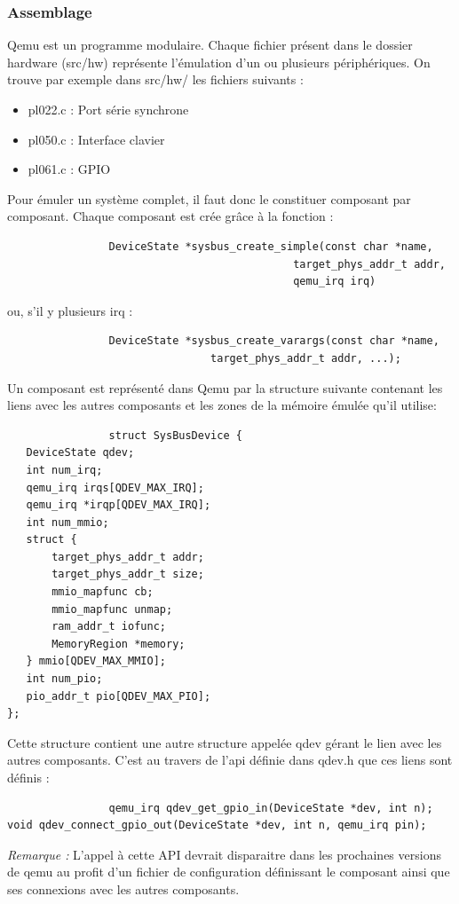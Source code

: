 \documentclass{article}
\begin{document}
		\subsubsection{Assemblage}
			Qemu est un programme modulaire. Chaque fichier présent dans le dossier hardware (src/hw) représente l'émulation d'un ou plusieurs 
			périphériques. On trouve par exemple dans src/hw/ les fichiers suivants : 
			\begin{itemize}
				\item pl022.c : Port série synchrone
				\item pl050.c : Interface clavier
				\item pl061.c : GPIO 
			\end{itemize}
			Pour émuler un système complet, il faut donc le constituer composant par composant. Chaque composant est crée grâce à la fonction : 
			\begin{verbatim}
				DeviceState *sysbus_create_simple(const char *name,
                                             target_phys_addr_t addr,
                                             qemu_irq irq)
			\end{verbatim}
			ou, s'il y plusieurs irq : 
			\begin{verbatim}
				DeviceState *sysbus_create_varargs(const char *name,
                                target_phys_addr_t addr, ...);
			\end{verbatim}
			Un composant est représenté dans Qemu par la structure suivante contenant les liens avec les autres composants et les zones de 
			la mémoire émulée qu'il utilise: 
			\begin{verbatim}
				struct SysBusDevice {
   DeviceState qdev;
   int num_irq;
   qemu_irq irqs[QDEV_MAX_IRQ];
   qemu_irq *irqp[QDEV_MAX_IRQ];
   int num_mmio;
   struct {
       target_phys_addr_t addr;
       target_phys_addr_t size;
       mmio_mapfunc cb;
       mmio_mapfunc unmap;
       ram_addr_t iofunc;
       MemoryRegion *memory;
   } mmio[QDEV_MAX_MMIO];
   int num_pio;
   pio_addr_t pio[QDEV_MAX_PIO];
};
			\end{verbatim}
			Cette structure contient une autre structure appelée qdev gérant le lien avec les autres composants. C'est au
			travers de l'api définie dans qdev.h que ces liens sont définis : 
			\begin{verbatim}
				qemu_irq qdev_get_gpio_in(DeviceState *dev, int n);
void qdev_connect_gpio_out(DeviceState *dev, int n, qemu_irq pin);
			\end{verbatim}
			\textit{Remarque :} L'appel à cette API devrait disparaitre dans les prochaines versions de qemu au profit d'un fichier de 
			configuration définissant le composant ainsi que ses connexions avec les autres composants.\\
\end{document}
